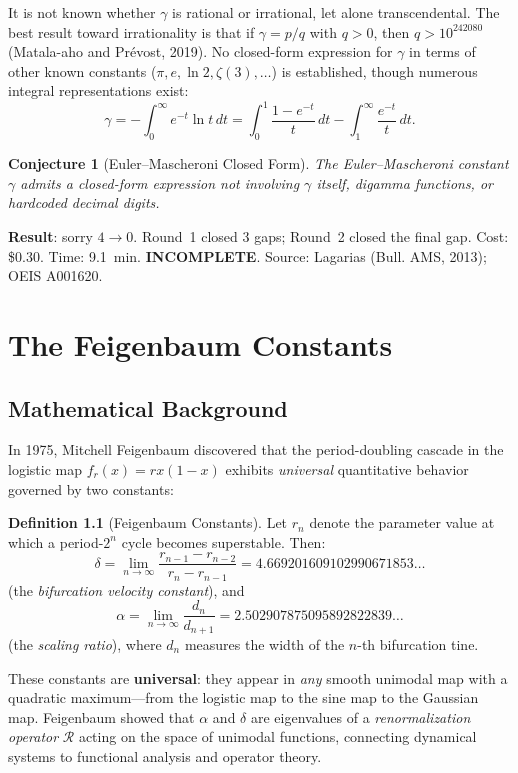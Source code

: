 \documentclass[12pt,a4paper]{report}
\theoremstyle{plain}
\newtheorem{conjecture}[theorem]{Conjecture}
\theoremstyle{definition}
\newtheorem{definition}[theorem]{Definition}
\theoremstyle{remark}
\newcommand{\verdict}[1]{\textbf{\textcolor{inkblue}{#1}}}
\begin{document}
It is not known whether $\gamma$ is rational or irrational, let alone transcendental.
The best result toward irrationality is that if $\gamma = p/q$ with $q > 0$, then
$q > 10^{242080}$ (Matala-aho and Prévost, 2019). No closed-form expression for
$\gamma$ in terms of other known constants ($\pi, e, \ln 2, \zeta(3), \ldots$) is
established, though numerous integral representations exist:
\[
  \gamma = -\int_0^\infty e^{-t} \ln t \, dt
  = \int_0^1 \frac{1 - e^{-t}}{t} \, dt - \int_1^\infty \frac{e^{-t}}{t} \, dt.
\]

\begin{conjecture}[Euler--Mascheroni Closed Form]
The Euler--Mascheroni constant $\gamma$ admits a closed-form expression not involving
$\gamma$ itself, digamma functions, or hardcoded decimal digits.
\end{conjecture}

\noindent\textbf{Result}: sorry $4 \to 0$. Round~1 closed 3 gaps; Round~2 closed the
final gap. Cost: \$0.30. Time: 9.1~min. \verdict{INCOMPLETE}. Source: Lagarias (Bull.
AMS, 2013); OEIS A001620.

\chapter{The Feigenbaum Constants}
\label{ch:feigenbaum}

\section{Mathematical Background}

In 1975, Mitchell Feigenbaum discovered that the period-doubling cascade in the
logistic map $f_r(x) = rx(1-x)$ exhibits \emph{universal} quantitative behavior
governed by two constants:

\begin{definition}[Feigenbaum Constants]
Let $r_n$ denote the parameter value at which a period-$2^n$ cycle becomes
superstable. Then:
\[
  \delta = \lim_{n\to\infty} \frac{r_{n-1} - r_{n-2}}{r_n - r_{n-1}}
  = 4.669201609102990671853\ldots
\]
(the \emph{bifurcation velocity constant}), and
\[
  \alpha = \lim_{n\to\infty} \frac{d_n}{d_{n+1}}
  = 2.502907875095892822839\ldots
\]
(the \emph{scaling ratio}), where $d_n$ measures the width of the $n$-th
bifurcation tine.
\end{definition}

These constants are \textbf{universal}: they appear in \emph{any} smooth unimodal
map with a quadratic maximum—from the logistic map to the sine map to the Gaussian
map. Feigenbaum showed that $\alpha$ and $\delta$ are eigenvalues of a
\emph{renormalization operator} $\mathcal{R}$ acting on the space of unimodal
functions, connecting dynamical systems to functional analysis and operator theory.
\end{document}
